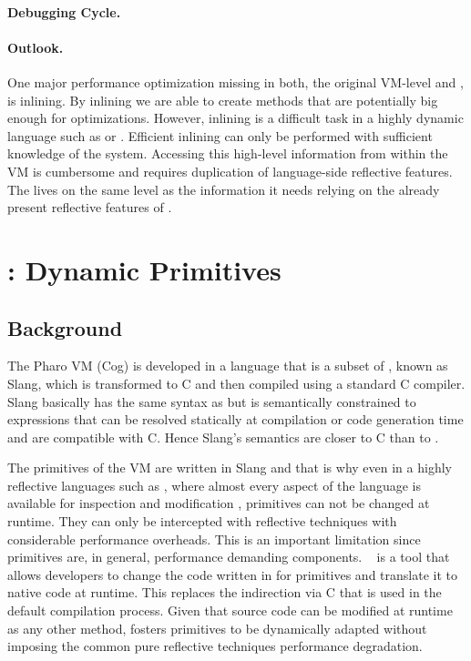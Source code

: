 \paragraph{Debugging Cycle.}

\paragraph{Outlook.}
One major performance optimization missing in both, the original \PH VM-level \JIT and \NBJ, is inlining. 
By inlining we are able to create methods that are potentially big enough for optimizations.
However, inlining is a difficult task in a highly dynamic language such as \ST or \Self \cite{Cham89a}. 
Efficient inlining can only be performed with sufficient knowledge of the system. 
Accessing this high-level information from within the VM is cumbersome and requires duplication of language-side reflective features.
The \JIT lives on the same level as the information it needs relying on the already present reflective features of \ST.


\section{\WF: Dynamic Primitives}


\subsection{Background}

The Pharo VM (Cog) is developed in a language that is a subset of \ST, known as Slang, which is transformed to C and then compiled using a standard C compiler.  
Slang basically has the same syntax as \ST but is semantically constrained to expressions that can be resolved statically at compilation or code generation time and are compatible with C.
Hence Slang's semantics are closer to C than to \ST. 

The primitives of the VM are written in Slang and that is why even in a highly reflective languages such as \ST, where almost every aspect of the language is available for inspection and modification \cite{Denk10a}, primitives can not be changed at runtime.
They can only be intercepted with reflective techniques with considerable performance overheads.
This is an important limitation since primitives are, in general, performance demanding components.
\WF~\cite{Char13a,Waterfall} is a tool that allows developers to change the code written in \Slang for primitives and translate it to native code at runtime.
This replaces the indirection via C that is used in the default compilation process.
Given that \Slang source code can be modified at runtime as any other \ST method, \WF fosters primitives to be dynamically adapted without imposing the common pure reflective techniques performance degradation.


